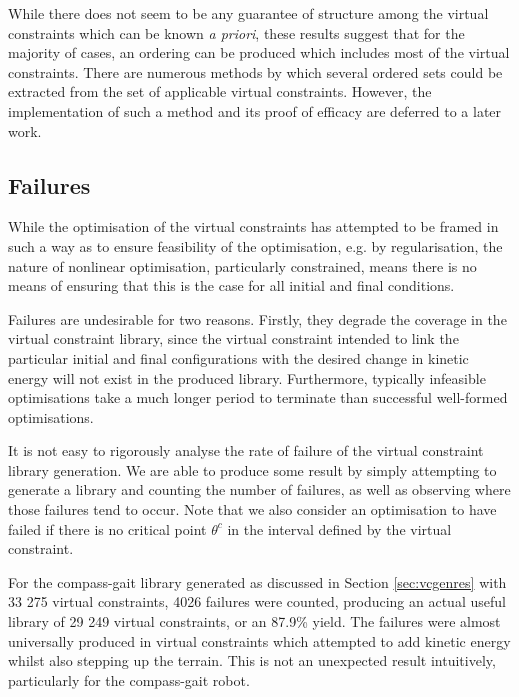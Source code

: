 While there does not seem to be any guarantee of structure among the virtual constraints which can be known \textit{a priori}, these results suggest that for the majority of cases, an ordering can be produced which includes most of the virtual constraints. There are numerous methods by which several ordered sets could be extracted from the set of applicable virtual constraints. However, the implementation of such a method and its proof of efficacy are deferred to a later work.

\subsection{Failures}
While the optimisation of the virtual constraints has attempted to be framed in such a way as to ensure feasibility of the optimisation, e.g. by regularisation, the nature of nonlinear optimisation, particularly constrained, means there is no means of ensuring that this is the case for all initial and final conditions.

Failures are undesirable for two reasons. Firstly, they degrade the coverage in the virtual constraint library, since the virtual constraint intended to link the particular initial and final configurations with the desired change in kinetic energy will not exist in the produced library. Furthermore, typically infeasible optimisations take a much longer period to terminate than successful well-formed optimisations.

It is not easy to rigorously analyse the rate of failure of the virtual constraint library generation. We are able to produce some result by simply attempting to generate a library and counting the number of failures, as well as observing where those failures tend to occur. Note that we also consider an optimisation to have failed if there is no critical point $\theta^c$ in the interval defined by the virtual constraint.

For the compass-gait library generated as discussed in Section \ref{sec:vcgenres} with 33 275 virtual constraints, 4026 failures were counted, producing an actual useful library of 29 249 virtual constraints, or an 87.9\% yield. The failures were almost universally produced in virtual constraints which attempted to add kinetic energy whilst also stepping up the terrain. This is not an unexpected result intuitively, particularly for the compass-gait robot.